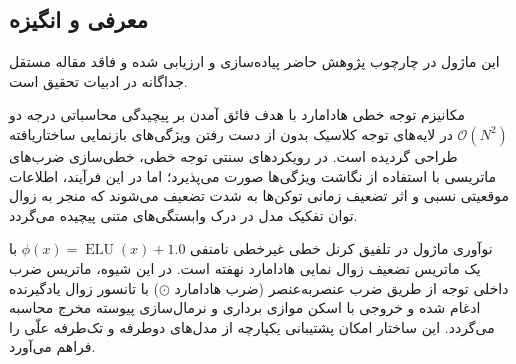 \subsection{معرفی و انگیزه}
این ماژول در چارچوب پژوهش حاضر پیاده‌سازی و ارزیابی شده و فاقد مقاله مستقل جداگانه در ادبیات تحقیق است.

مکانیزم توجه خطی هادامارد  با هدف فائق آمدن بر پیچیدگی محاسباتی درجه دو $\mathcal{O}(N^2)$ در لایه‌های توجه کلاسیک بدون از دست رفتن ویژگی‌های بازنمایی ساختاریافته طراحی گردیده است. در رویکردهای سنتی توجه خطی، خطی‌سازی ضرب‌های ماتریسی با استفاده از نگاشت ویژگی‌ها صورت می‌پذیرد؛ اما در این فرآیند، اطلاعات موقعیتی نسبی و اثر تضعیف زمانی توکن‌ها به شدت تضعیف می‌شوند که منجر به زوال توان تفکیک مدل در درک وابستگی‌های متنی پیچیده می‌گردد.

نوآوری ماژول  در تلفیق کرنل خطی غیرخطی نامنفی $\phi(x) = \operatorname{ELU}(x) + 1.0$ با یک ماتریس تضعیف زوال نمایی هادامارد  نهفته است. در این شیوه، ماتریس ضرب داخلی توجه از طریق ضرب عنصر‌به‌عنصر (ضرب هادامارد $\odot$) با تانسور زوال یادگیرنده ادغام شده و خروجی با اسکن موازی برداری و نرمال‌سازی پیوسته مخرج محاسبه می‌گردد. این ساختار امکان پشتیبانی یکپارچه از مدل‌های دوطرفه  و تک‌طرفه علّی  را فراهم می‌آورد.
